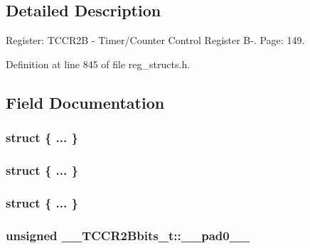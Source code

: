 \subsection{Detailed Description}
Register\+: T\+C\+C\+R2\+B -\/ Timer/\+Counter Control Register B-\/. Page\+: 149. 

Definition at line 845 of file reg\+\_\+structs.\+h.



\subsection{Field Documentation}
\hypertarget{union_____t_c_c_r2_bbits__t_a3fe9a5b4ba4c7864428ae237d785b3be}{\subsubsection[{"@207}]{\setlength{\rightskip}{0pt plus 5cm}struct \{ ... \} }}\label{union_____t_c_c_r2_bbits__t_a3fe9a5b4ba4c7864428ae237d785b3be}
\hypertarget{union_____t_c_c_r2_bbits__t_ae09323efbeafd60d43c9f5017af24b3d}{\subsubsection[{"@209}]{\setlength{\rightskip}{0pt plus 5cm}struct \{ ... \} }}\label{union_____t_c_c_r2_bbits__t_ae09323efbeafd60d43c9f5017af24b3d}
\hypertarget{union_____t_c_c_r2_bbits__t_ab88387e6d373215d0498d41ed48c4c9f}{\subsubsection[{"@211}]{\setlength{\rightskip}{0pt plus 5cm}struct \{ ... \} }}\label{union_____t_c_c_r2_bbits__t_ab88387e6d373215d0498d41ed48c4c9f}
\hypertarget{union_____t_c_c_r2_bbits__t_ac6f2c180e18327465bc76f6f9753d84e}{
\subsubsection[{\+\_\+\+\_\+pad0\+\_\+\+\_\+}]{\setlength{\rightskip}{0pt plus 5cm}unsigned \+\_\+\+\_\+\+T\+C\+C\+R2\+Bbits\+\_\+t\+::\+\_\+\+\_\+pad0\+\_\+\+\_\+}}\label{union_____t_c_c_r2_bbits__t_ac6f2c180e18327465bc76f6f9753d84e}


